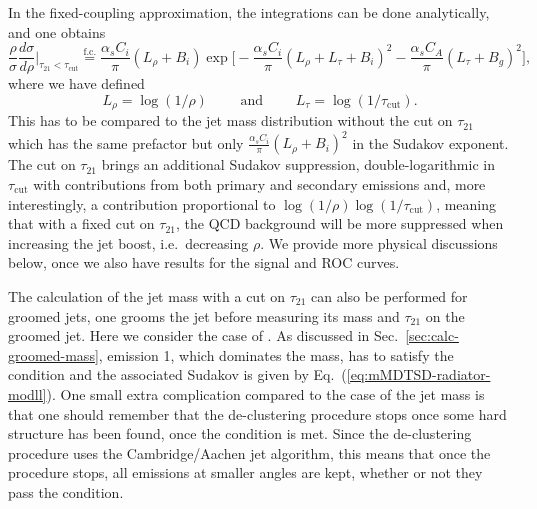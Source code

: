 In the fixed-coupling approximation, the integrations can be
done analytically, and one obtains
\begin{equation}\label{eq:mass-distrib-tau21-fc}
  \frac{\rho}{\sigma} \frac{d\sigma}{d\rho}\Big|_{\tau_{21}<\tau_\text{cut}}
  \overset{\text{f.c.}}{=}
  \frac{\alpha_s C_i}{\pi} (L_\rho+B_i)
  \exp\Big[-\frac{\alpha_sC_i}{\pi}(L_\rho+L_\tau+B_i)^2
  - \frac{\alpha_sC_A}{\pi}(L_\tau+B_g)^2\Big] ,
\end{equation}
where we have defined
\begin{equation}
  L_\rho = \log(1/\rho)\qquad\text{ and }\qquad
  L_\tau=\log(1/\tau_\text{cut}).
\end{equation}
This has to be compared to the jet mass distribution without the cut
on $\tau_{21}$ which has the same prefactor but only
$\tfrac{\alpha_sC_i}{\pi}(L_\rho+B_i)^2$ in the Sudakov exponent.
%
The cut on $\tau_{21}$ brings an additional Sudakov suppression,
double-logarithmic in $\tau_\text{cut}$ with contributions from both
primary and secondary emissions and, more interestingly, a
contribution proportional to $\log(1/\rho)\log(1/\tau_\text{cut})$,
meaning that with a fixed cut on $\tau_{21}$, the QCD background will
be more suppressed when increasing the jet boost, i.e.\ decreasing $\rho$.
%
We provide more physical discussions below, once we also have
results for the signal and ROC curves.

The calculation of the jet mass with a cut on $\tau_{21}$ can also be
performed for groomed jets, \ie one grooms the jet before measuring
its mass and $\tau_{21}$ on the groomed jet.
%
Here we consider the case of \SD. 
%
As discussed in Sec.~\ref{sec:calc-groomed-mass}, emission 1, which
dominates the \SD mass, has to satisfy the \SD condition and the
associated Sudakov is given by Eq.~(\ref{eq:mMDTSD-radiator-modll}).
%
One small extra complication compared to the case of the \SD jet mass
is that one should
remember that the \SD de-clustering procedure stops once some hard
structure has been found, \ie once the \SD condition is met.
%
Since the de-clustering procedure uses the Cambridge/Aachen jet algorithm, this
means that once the procedure stops, all emissions at smaller angles
are kept, whether or not they pass the \SD condition.

